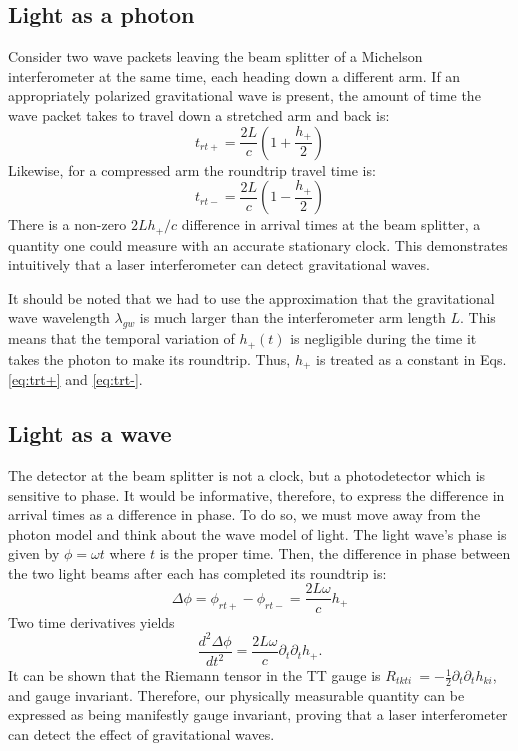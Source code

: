 \subsection{Light as a photon} 
Consider two wave packets leaving the beam splitter of a Michelson
interferometer at the same time, each heading down a different arm. If
an appropriately polarized gravitational wave is present, the amount
of time the wave packet takes to travel down a stretched arm and back
is:
\begin{equation}
\label{eq:trt+} 
t_{rt+} = \frac{2 L}{c} \left( 1 + \frac{h_+}{2} \right)
\end{equation}
Likewise, for a compressed arm the roundtrip travel time is:
\begin{equation}
\label{eq:trt-} 
t_{rt-} = \frac{2 L}{c} \left( 1 - \frac{h_+}{2} \right)
\end{equation}
There is a non-zero $2Lh_+/c$ difference in arrival times at the beam splitter, a quantity
one could measure with an accurate stationary clock. This demonstrates intuitively that
a laser interferometer can detect gravitational waves.

It should be noted that we had to use the approximation that the
gravitational wave wavelength $\lambda_{gw}$ is much larger than the
interferometer arm length $L$. This means that the temporal variation
of $h_+(t)$ is negligible during the time it takes the photon to make
its roundtrip. Thus, $h_+$ is treated as a constant in
Eqs. \ref{eq:trt+} and \ref{eq:trt-}.


\subsection{Light as a wave}
The detector at the beam splitter is not a clock, but a photodetector
which is sensitive to phase. It would be informative, therefore, to express
the difference in arrival times as a difference in phase. To do so, we
must move away from the photon model and think about the wave model of
light.  The light wave's phase is given by $\phi = \omega t$ where $t$ is the proper time. Then, the
difference in phase between the two light beams after each has
completed its roundtrip is:
\begin{equation}
\Delta \phi = \phi_{rt+} - \phi_{rt-} = \frac{2 L \omega}{c} h_+
\end{equation}
Two time derivatives yields 
\begin{equation}
\frac{d^2\Delta \phi}{dt^2} = \frac{2 L \omega}{c} \partial_t \partial_t h_+.
\end{equation}
It can be shown \cite{Garfinkle2005Gauge} that the Riemann tensor in
the TT gauge is $R_{tkti}~=-\frac{1}{2}\partial_t \partial_t h_{ki}$,
and gauge invariant. Therefore, our
physically measurable quantity can be expressed as being manifestly
gauge invariant, proving that a laser interferometer can detect the
effect of gravitational waves.



